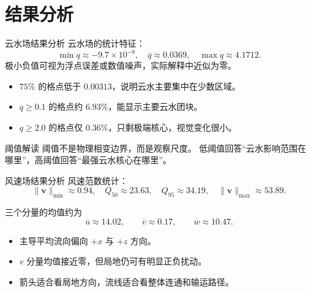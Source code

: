 \documentclass[aspectratio=169,11pt]{ctexbeamer}
\newcommand{\vv}{\mathbf v}
\begin{document}
\section{结果分析}

\begin{frame}{云水场结果分析}
  \small
  云水场的统计特征：
  \[
    \min q\approx -9.7\times 10^{-8},\quad
    \overline q\approx 0.0369,\quad
    \max q\approx 4.1712 .
  \]
  极小负值可视为浮点误差或数值噪声，实际解释中近似为零。

  \begin{itemize}
    \item $75\%$ 的格点低于 $0.00313$，说明云水主要集中在少数区域。
    \item $q\ge 0.1$ 的格点约 $6.93\%$，能显示主要云水团块。
    \item $q\ge 2.0$ 的格点仅 $0.36\%$，只剩极端核心，视觉变化很小。
  \end{itemize}

  \begin{block}{阈值解读}
    阈值不是物理相变边界，而是观察尺度。
    低阈值回答“云水影响范围在哪里”，高阈值回答“最强云水核心在哪里”。
  \end{block}
\end{frame}

\begin{frame}{风速场结果分析}
  \small
  风速范数统计：
  \[
    \|\vv\|_{\min}\approx0.94,\quad
    Q_{50}\approx23.63,\quad
    Q_{95}\approx34.19,\quad
    \|\vv\|_{\max}\approx53.89 .
  \]

  三个分量的均值约为
  \[
    \overline u\approx 14.02,\qquad
    \overline v\approx 0.17,\qquad
    \overline w\approx 10.47 .
  \]

  \begin{itemize}
    \item 主导平均流向偏向 $+x$ 与 $+z$ 方向。
    \item $v$ 分量均值接近零，但局地仍可有明显正负扰动。
    \item 箭头适合看局地方向，流线适合看整体连通和输运路径。
  \end{itemize}
\end{frame}
\end{document}
